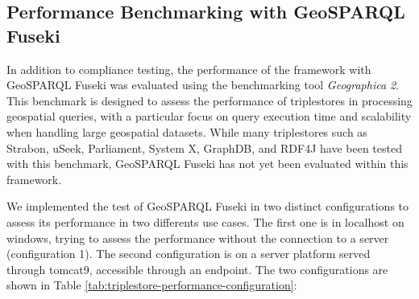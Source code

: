 \subsection{Performance Benchmarking with GeoSPARQL Fuseki}\label{VI-subsec:performance-geosparql}

In addition to compliance testing, the performance of the framework with GeoSPARQL Fuseki was evaluated using the benchmarking tool \textit{Geographica 2}\cite{ioannidisEvaluatingGeospatialRDF2021}. This benchmark is designed to assess the performance of triplestores in processing geospatial queries, with a particular focus on query execution time and scalability when handling large geospatial datasets. While many triplestores such as Strabon, uSeek, Parliament, System X, GraphDB, and RDF4J have been tested with this benchmark, GeoSPARQL Fuseki has not yet been evaluated within this framework.

We implemented the test of GeoSPARQL Fuseki in two distinct configurations to assess its performance in two differents use cases. The first one is in localhost on windows, trying to assess the performance without the connection to a server (configuration 1). The second configuration is on a server platform served through tomcat9, accessible through an endpoint. The two configurations are shown in Table \ref{tab:triplestore-performance-configuration}:

